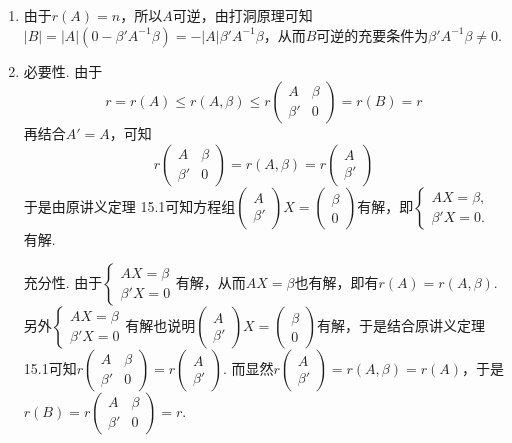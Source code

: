 \documentclass[12pt,fontset=fandol]{ctexart}
\begin{document}
\begin{solve}
\begin{enumerate}
                \item 由于$r(A)=n$，所以$A$可逆，由打洞原理可知$|B|=|A|(0-\beta' A^{-1}\beta)=-|A|\beta' A^{-1}\beta$，从而$B$可逆的充要条件为$\beta' A^{-1}\beta\neq 0$.

                \item 必要性. 由于
                      \[ r=r(A)\leqslant r(A,\beta)\leqslant r\begin{pmatrix} A & \beta \\ \beta' & 0 \end{pmatrix}=r(B)=r \]
                      再结合$A'=A$，可知
                      \[ r\begin{pmatrix} A & \beta \\ \beta' & 0 \end{pmatrix} =r(A,\beta)=r\begin{pmatrix} A \\ \beta' \end{pmatrix} \]
                      于是由原讲义定理 15.1可知方程组$\begin{pmatrix} A \\ \beta' \end{pmatrix}X=\begin{pmatrix} \beta \\ 0 \end{pmatrix}$有解，即$\begin{cases} AX=\beta, \\ \beta' X=0. \end{cases}$有解.

                      充分性. 由于$\begin{cases} AX=\beta \\ \beta' X=0 \end{cases}$有解，从而$AX=\beta$也有解，即有$r(A)=r(A,\beta)$. 另外$\begin{cases} AX=\beta \\ \beta' X=0 \end{cases}$有解也说明$\begin{pmatrix} A \\ \beta' \end{pmatrix}X=\begin{pmatrix} \beta \\ 0 \end{pmatrix}$有解，于是结合原讲义定理 15.1可知$r\begin{pmatrix} A & \beta \\ \beta' & 0 \end{pmatrix}=r\begin{pmatrix} A \\ \beta' \end{pmatrix}$. 而显然$r\begin{pmatrix} A \\ \beta' \end{pmatrix}=r(A,\beta)=r(A)$，于是$r(B)=r\begin{pmatrix} A & \beta \\ \beta' & 0 \end{pmatrix}=r$.


\end{enumerate}
\end{solve}
\end{document}
